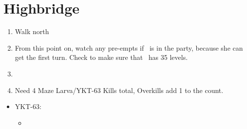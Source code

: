 \chapter{Highbridge}
\begin{spheregrid}
	\begin{itemize}
		\yunaf
	\end{itemize}
\end{spheregrid}
\begin{enumerate}
	\item Walk north
	\item From this point on, watch any pre-empts if \yuna\ is in the party, because she can get the first turn. Check to make sure that \lulu\ has 35 levels.
	\item \formation{\tidus}{\yuna}{\auron}
	\item Need 4 Maze Larva/YKT-63 Kills total, Overkills add 1 to the count.
\end{enumerate}
\bothvfill
\winvfill
\begin{encounters}
	\begin{itemize}
		\item YKT-63:
		      \begin{itemize}
			      \tidusf Attack
			      \yunaf Attack
			      \item \flee
		      \end{itemize}
	\end{itemize}
\end{encounters}

